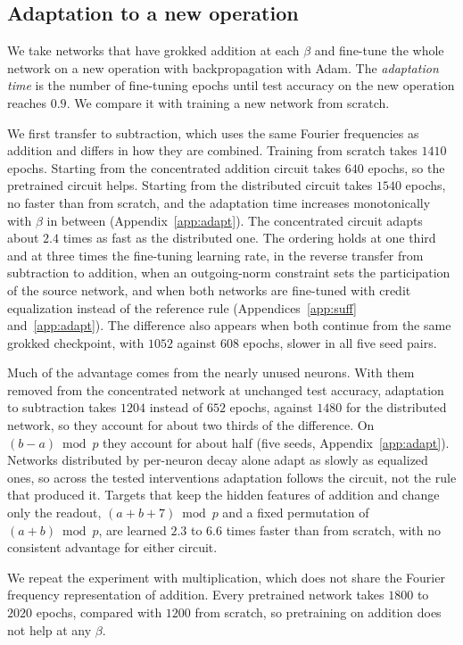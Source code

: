 \documentclass{article} %
\begin{document}
\subsection{Adaptation to a new operation}
We take networks that have grokked addition at each $\beta$ and fine-tune the whole network on a new operation with backpropagation with Adam. The \emph{adaptation time} is the number of fine-tuning epochs until test accuracy on the new operation reaches $0.9$. We compare it with training a new network from scratch.

We first transfer to subtraction, which uses the same Fourier frequencies as addition and differs in how they are combined. Training from scratch takes $1410$ epochs. Starting from the concentrated addition circuit takes $640$ epochs, so the pretrained circuit helps. Starting from the distributed circuit takes $1540$ epochs, no faster than from scratch, and the adaptation time increases monotonically with $\beta$ in between (Appendix~\ref{app:adapt}). The concentrated circuit adapts about $2.4$ times as fast as the distributed one. The ordering holds at one third and at three times the fine-tuning learning rate, in the reverse transfer from subtraction to addition, when an outgoing-norm constraint sets the participation of the source network, and when both networks are fine-tuned with credit equalization instead of the reference rule (Appendices~\ref{app:suff} and~\ref{app:adapt}). The difference also appears when both continue from the same grokked checkpoint, with $1052$ against $608$ epochs, slower in all five seed pairs.

Much of the advantage comes from the nearly unused neurons. With them removed from the concentrated network at unchanged test accuracy, adaptation to subtraction takes $1204$ instead of $652$ epochs, against $1480$ for the distributed network, so they account for about two thirds of the difference. On $(b - a) \bmod p$ they account for about half (five seeds, Appendix~\ref{app:adapt}). Networks distributed by per-neuron decay alone adapt as slowly as equalized ones, so across the tested interventions adaptation follows the circuit, not the rule that produced it. Targets that keep the hidden features of addition and change only the readout, $(a + b + 7) \bmod p$ and a fixed permutation of $(a + b) \bmod p$, are learned $2.3$ to $6.6$ times faster than from scratch, with no consistent advantage for either circuit.

We repeat the experiment with multiplication, which does not share the Fourier frequency representation of addition. Every pretrained network takes $1800$ to $2020$ epochs, compared with $1200$ from scratch, so pretraining on addition does not help at any $\beta$.
\end{document}
